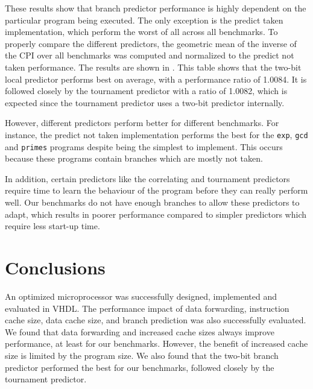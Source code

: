\documentclass[conference, hidelinks]{IEEEtran}
\begin{document}
These results show that branch predictor performance is highly dependent on the particular program being executed. The only exception is the predict taken implementation, which perform the worst of all across all benchmarks. To properly compare the different predictors, the geometric mean of the inverse of the CPI over all benchmarks was computed and normalized to the predict not taken performance. The results are shown in . This table shows that the two-bit local predictor performs best on average, with a performance ratio of 1.0084. It is followed closely by the tournament predictor with a ratio of 1.0082, which is expected since the tournament predictor uses a two-bit predictor internally.

\begin{table}[!htb]
\small
\centering
\caption{Relative performance of different branch predictors.}
\label{tab:bp_performance}
\end{table}

However, different predictors perform better for different benchmarks. For instance, the predict not taken implementation performs the best for the \texttt{exp}, \texttt{gcd} and \texttt{primes} programs despite being the simplest to implement. This occurs because these programs contain branches which are mostly not taken.

In addition, certain predictors like the correlating and tournament predictors require time to learn the behaviour of the program before they can really perform well. Our benchmarks do not have enough branches to allow these predictors to adapt, which results in poorer performance compared to simpler predictors which require less start-up time.

\section{Conclusions}

An optimized microprocessor was successfully designed, implemented and evaluated in VHDL. The performance impact of data forwarding, instruction cache size, data cache size, and branch prediction was also successfully evaluated. We found that data forwarding and increased cache sizes always improve performance, at least for our benchmarks. However, the benefit of increased cache size is limited by the program size. We also found that the two-bit branch predictor performed the best for our benchmarks, followed closely by the tournament predictor.
\end{document}

